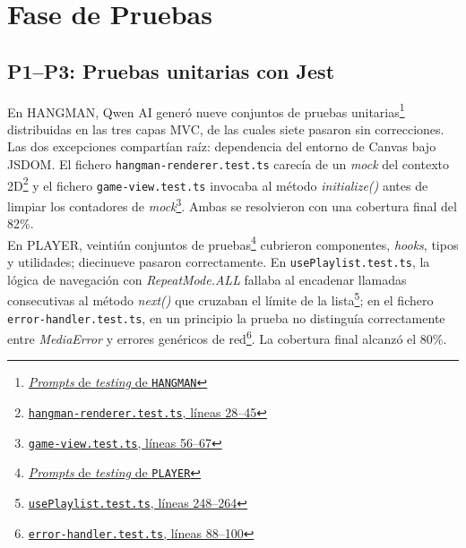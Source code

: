 \section{Fase de Pruebas} \label{sec:dev-testing}

\subsection{P1--P3: Pruebas unitarias con Jest}

En \ac{HANGMAN}, Qwen AI generó nueve conjuntos de pruebas unitarias\footnote{\href{https://github.com/alu0101549491/TFG-Fabian-Gonzalez-Lence/tree/main/resources/prompts/1-TheHangmanGame/5-TestingPorModulo}{\textit{Prompts} de \textit{testing} de \texttt{HANGMAN}}} distribuidas en las tres capas \ac{MVC}, de las cuales siete pasaron sin correcciones. Las dos excepciones compartían raíz: dependencia del entorno de Canvas bajo JSDOM. El fichero \texttt{hangman-renderer.test.ts} carecía de un \textit{mock} del contexto 2D\footnote{\href{https://github.com/alu0101549491/TFG-Fabian-Gonzalez-Lence/blob/main/projects/1-TheHangmanGame/tests/views/hangman-renderer.test.ts\#L28-L45}{\texttt{hangman-renderer.test.ts}, líneas 28--45}} y el fichero \texttt{game-view.test.ts} invocaba al método \textit{initialize()} antes de limpiar los contadores de \textit{mock}\footnote{\href{https://github.com/alu0101549491/TFG-Fabian-Gonzalez-Lence/blob/main/projects/1-TheHangmanGame/tests/views/game-view.test.ts\#L56-L67}{\texttt{game-view.test.ts}, líneas 56--67}}. Ambas se resolvieron con una cobertura final del 82\%.\\

En \ac{PLAYER}, veintiún conjuntos de pruebas\footnote{\href{https://github.com/alu0101549491/TFG-Fabian-Gonzalez-Lence/tree/main/resources/prompts/2-MusicWebPlayer/5-TestingPorModulo}{\textit{Prompts} de \textit{testing} de \texttt{PLAYER}}} cubrieron componentes, \textit{hooks}, tipos y utilidades; diecinueve pasaron correctamente. En \texttt{usePlaylist.test.ts}, la lógica de navegación con \textit{RepeatMode.ALL} fallaba al encadenar llamadas consecutivas al método \textit{next()} que cruzaban el límite de la lista\footnote{\href{https://github.com/alu0101549491/TFG-Fabian-Gonzalez-Lence/blob/main/projects/2-MusicWebPlayer/tests/hooks/usePlaylist.test.ts\#L248-L264}{\texttt{usePlaylist.test.ts}, líneas 248--264}}; en el fichero \texttt{error-handler.test.ts}, en un principio la prueba no distinguía correctamente entre \textit{MediaError} y errores genéricos de red\footnote{\href{https://github.com/alu0101549491/TFG-Fabian-Gonzalez-Lence/blob/main/projects/2-MusicWebPlayer/tests/utils/error-handler.test.ts\#L88-L100}{\texttt{error-handler.test.ts}, líneas 88--100}}. La cobertura final alcanzó el 80\%.\\

